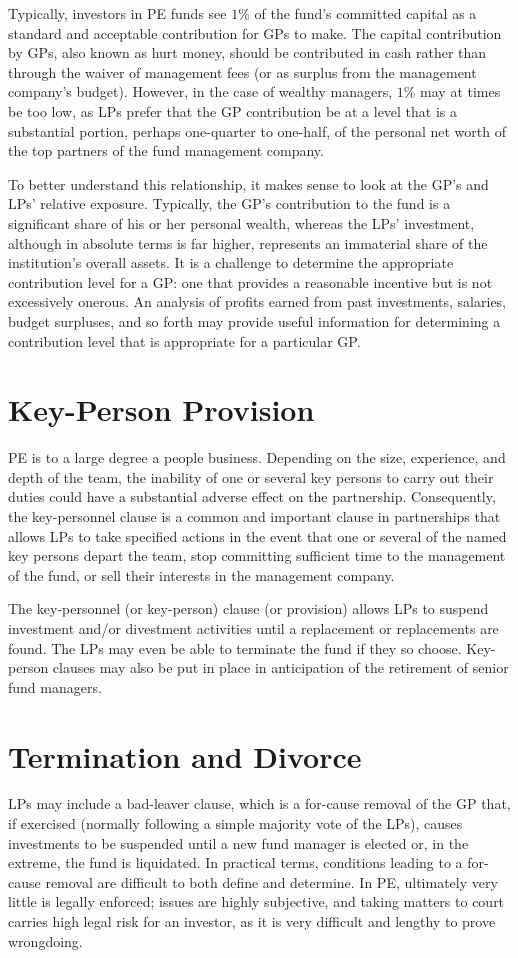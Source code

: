 \documentclass[11pt]{article}
\begin{document}
Typically, investors in PE funds see $1 \%$ of the fund's committed capital as a standard and acceptable contribution for GPs to make. The capital contribution by GPs, also known as hurt money, should be contributed in cash rather than through the waiver of management fees (or as surplus from the management company's budget). However, in the case of wealthy managers, $1 \%$ may at times be too low, as LPs prefer that the GP contribution be at a level that is a substantial portion, perhaps one-quarter to one-half, of the personal net worth of the top partners of the fund management company.

To better understand this relationship, it makes sense to look at the GP's and LPs' relative exposure. Typically, the GP's contribution to the fund is a significant share of his or her personal wealth, whereas the LPs' investment, although in absolute terms is far higher, represents an immaterial share of the institution's overall assets. It is a challenge to determine the appropriate contribution level for a GP: one that provides a reasonable incentive but is not excessively onerous. An analysis of profits earned from past investments, salaries, budget surpluses, and so forth may provide useful information for determining a contribution level that is appropriate for a particular GP.

\section*{Key-Person Provision}
PE is to a large degree a people business. Depending on the size, experience, and depth of the team, the inability of one or several key persons to carry out their duties could have a substantial adverse effect on the partnership. Consequently, the key-personnel clause is a common and important clause in partnerships that allows LPs to take specified actions in the event that one or several of the named key persons depart the team, stop committing sufficient time to the management of the fund, or sell their interests in the management company.

The key-personnel (or key-person) clause (or provision) allows LPs to suspend investment and/or divestment activities until a replacement or replacements are found. The LPs may even be able to terminate the fund if they so choose. Key-person clauses may also be put in place in anticipation of the retirement of senior fund managers.

\section*{Termination and Divorce}
LPs may include a bad-leaver clause, which is a for-cause removal of the GP that, if exercised (normally following a simple majority vote of the LPs), causes investments to be suspended until a new fund manager is elected or, in the extreme, the fund is liquidated. In practical terms, conditions leading to a for-cause removal are difficult to both define and determine. In PE, ultimately very little is legally enforced; issues are highly subjective, and taking matters to court carries high legal risk for an investor, as it is very difficult and lengthy to prove wrongdoing.
\end{document}

